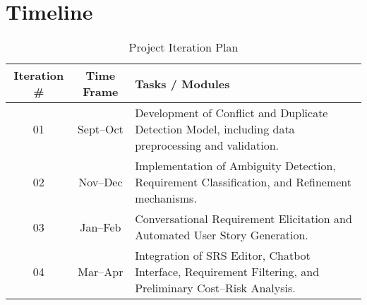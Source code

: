 \section{Timeline}

\begin{table}[!ht]
\caption{Project Iteration Plan} 
\begin{tabular}{|c|c|p{9cm}|} \hline
\textbf{Iteration \#} & \textbf{Time Frame} & \textbf{Tasks / Modules} \\ \hline
01 & Sept–Oct & Development of Conflict and Duplicate Detection Model, including data preprocessing and validation. \\ \hline
02 & Nov–Dec  & Implementation of Ambiguity Detection, Requirement Classification, and Refinement mechanisms. \\ \hline
03 & Jan–Feb  & Conversational Requirement Elicitation and Automated User Story Generation. \\ \hline
04 & Mar–Apr  & Integration of SRS Editor, Chatbot Interface, Requirement Filtering, and Preliminary Cost–Risk Analysis. \\ \hline
\end{tabular}
\end{table}